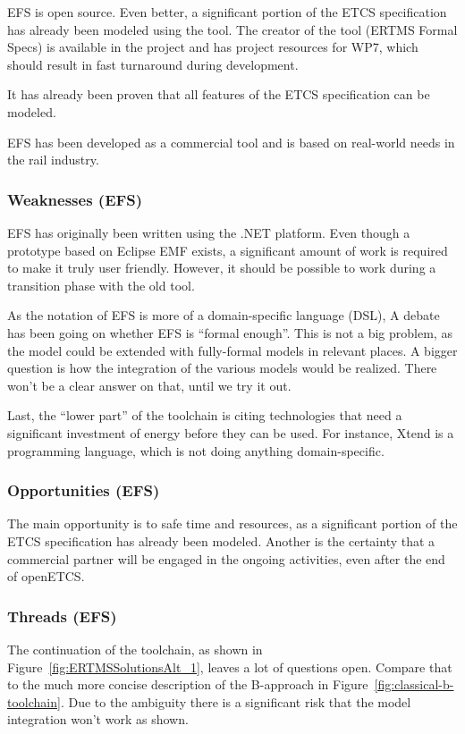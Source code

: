 EFS is open source.  Even better, a significant portion of the ETCS specification has already been modeled using the tool.  The creator of the tool (ERTMS Formal Specs) is available in the project and has project resources for WP7, which should result in fast turnaround during development.

It has already been proven that all features of the ETCS specification can be modeled.

EFS has been developed as a commercial tool and is based on real-world needs in the rail industry.

\subsubsection{Weaknesses (EFS)}

EFS has originally been written using the .NET platform.  Even though a prototype based on Eclipse EMF exists, a significant amount of work is required to make it truly user friendly.  However, it should be possible to work during a transition phase with the old tool.

As the notation of EFS is more of a domain-specific language (DSL), A debate has been going on whether EFS is ``formal enough''.  This is not a big problem, as the model could be extended with fully-formal models in relevant places.  A bigger question is how the integration of the various models would be realized.  There won't be a clear answer on that, until we try it out.

Last, the ``lower part'' of the toolchain is citing technologies that need a significant investment of energy before they can be used.  For instance, Xtend is a programming language, which is not doing anything domain-specific.

\subsubsection{Opportunities (EFS)}

The main opportunity is to safe time and resources, as a significant portion of the ETCS specification has already been modeled.  Another is the certainty that a commercial partner will be engaged in the ongoing activities, even after the end of openETCS.

\subsubsection{Threads (EFS)}

The continuation of the toolchain, as shown in Figure~\ref{fig:ERTMSSolutionsAlt_1}, leaves a lot of questions open.  Compare that to the much more concise description of the B-approach in Figure~\ref{fig:classical-b-toolchain}.  Due to the ambiguity there is a significant risk that the model integration won't work as shown.

